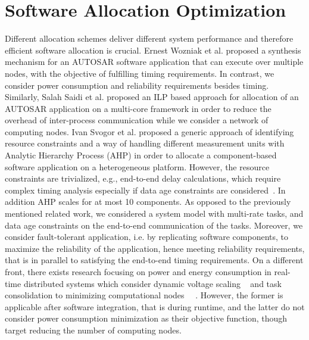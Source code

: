 \section{Software Allocation Optimization}
Different allocation schemes deliver different system performance and therefore efficient software allocation is crucial. Ernest Wozniak et al. \cite{Wozniak2013AnArchitectures} proposed a synthesis mechanism for an AUTOSAR software application that can execute over multiple nodes, with the objective of fulfilling timing requirements. In contrast, we consider power consumption and reliability requirements besides timing. Similarly, Salah Saidi et al. \cite{Saidi2015AnArchitectures} proposed an ILP based approach for allocation of an AUTOSAR application on a multi-core framework in order to reduce the overhead of inter-process communication while we consider a network of computing nodes. Ivan Svogor et al. \cite{vsvogor2014extended} proposed a generic approach of identifying resource constraints and a way of handling different measurement units with Analytic Hierarchy Process (AHP) in order to allocate a component-based software application on a heterogeneous platform. However, the resource constraints are trivialized, e.g., end-to-end delay calculations, which require complex timing analysis especially if data age constraints are considered~\cite{mubeen2013support}. In addition AHP scales for at most 10 components. As opposed to the previously mentioned related work, we considered a system model with multi-rate tasks, and data age constraints on the end-to-end communication of the tasks. Moreover, we consider fault-tolerant application, i.e. by replicating software components, to maximize the reliability of the application, hence meeting reliability requirements, that is in parallel to satisfying the end-to-end timing requirements. On a different front, there exists research focusing on power and energy consumption in real-time distributed systems which consider dynamic voltage scaling ~\cite{bambagini2016energy} and task consolidation to minimizing computational nodes ~\cite{faragardi2013towards}~\cite{devadas2012interplay}. However, the former is applicable after software integration, that is during runtime, and the latter do not consider power consumption minimization as their objective function, though target reducing the number of computing nodes.